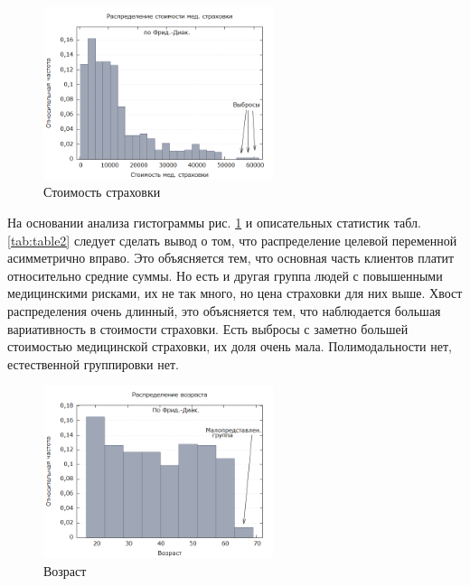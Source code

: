 \documentclass[a4paper,12pt]{article}
\begin{document}
\begin{figure}[H]
	\includegraphics[width=0.6\textwidth]{../[graphics]/charges.png}
	\centering
	\caption{Стоимость страховки}
	\label{fig:charges}
\end{figure}

На основании анализа гистограммы рис. \ref{fig:charges} и описательных статистик табл. \ref{tab:table2} следует сделать вывод о том, что распределение целевой переменной асимметрично вправо. Это объясняется тем, что основная часть клиентов платит относительно средние суммы. Но есть и другая группа людей с повышенными медицинскими рисками, их не так много, но цена страховки для них выше. Хвост распределения очень длинный, это объясняется тем, что наблюдается большая вариативность в стоимости страховки. Есть выбросы с заметно большей стоимостью медицинской страховки, их доля очень мала. Полимодальности нет, естественной группировки нет.

\begin{figure}[H]
	\includegraphics[width=0.6\textwidth]{../[graphics]/age.png}
	\centering
	\caption{Возраст}
	\label{fig:age}
\end{figure}
\end{document}
